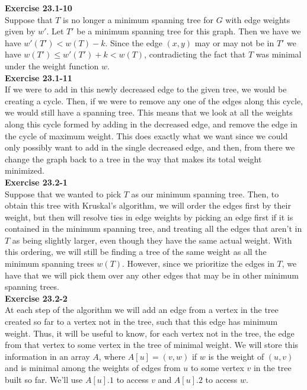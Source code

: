 \documentclass{article}
\begin{document}
\noindent\textbf{Exercise 23.1-10}\\

Suppose that $T$ is no longer a minimum spanning tree for $G$ with edge weights given by $w'$.  Let $T'$ be a minimum spanning tree for this graph.  Then we have we have $w'(T') < w(T) - k$.  Since the edge $(x,y)$ may or may not be in $T'$ we have $w(T') \leq w'(T') + k < w(T)$, contradicting the fact that $T$ was minimal under the weight function $w$. \\

\noindent\textbf{Exercise 23.1-11}\\

If we were to add in this newly decreased edge to the given tree, we would be creating a cycle. Then, if we were to remove any one of the edges along this cycle, we would still have a spanning tree. This means that we look at all the weights along this cycle formed by adding in the decreased edge, and remove the edge in the cycle of maximum weight. This does exactly what we want since we could only possibly want to add in the single decreased edge, and then, from there we change the graph back to a tree in the way that makes its total weight minimized.\\

\noindent\textbf{Exercise 23.2-1}\\

Suppose that we wanted to pick $T$ as our minimum spanning tree. Then, to obtain this tree with Kruskal's algorithm, we will order the edges first by their weight, but then will resolve ties in edge weights by picking an edge first if it is contained in the minimum spanning tree, and treating all the edges that aren't in $T$ as being slightly larger, even though they have the same actual weight. With this ordering, we will still be finding a tree of the same weight as all the minimum spanning trees $w(T)$. However, since we prioritize the edges in $T$, we have that we will pick them over any other edges that may be in other minimum spanning trees.\\

\noindent\textbf{Exercise 23.2-2}\\

At each step of the algorithm we will add an edge from a vertex in the tree created so far to a vertex not in the tree, such that this edge has minimum weight.  Thus, it will be useful to know, for each vertex not in the tree, the edge from that vertex to some vertex in the tree of minimal weight.  We will store this information in an array $A$, where $A[u] = (v, w)$ if $w$ is the weight of $(u,v)$ and is minimal among the weights of edges from $u$ to some vertex $v$ in the tree built so far.  We'll use $A[u].1$ to access $v$ and $A[u].2$ to access $w$.\\
\end{document}
